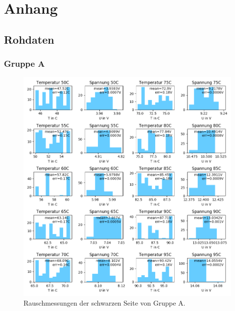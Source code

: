 \documentclass[12pt,a4paper]{article}
\begin{document}
\section{Anhang}
\subsection{Rohdaten}
\subsubsection{Gruppe A}

\begin{figure}[H]
\includegraphics[scale=0.8]{Bilder/Rauschen_A_schwarz_2.png}
\caption{Rauschmessungen der schwarzen Seite von Gruppe A.}
\end{figure}
\end{document}
